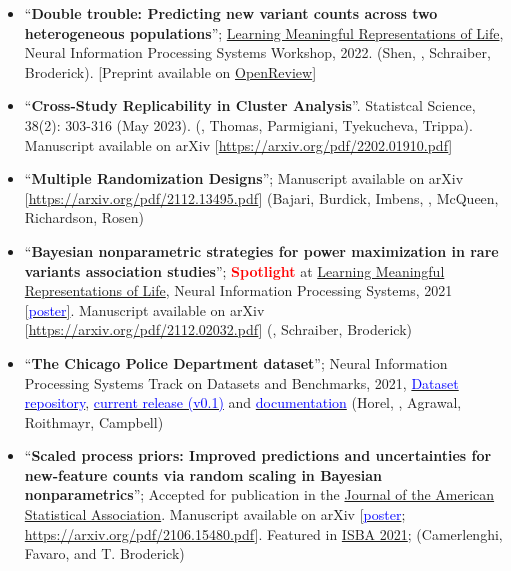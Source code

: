 \documentclass[10pt, a4paper]{article}
\begin{document}
\begin{itemize}
	\item ``\textbf{Double trouble: Predicting new variant counts across two heterogeneous populations}''; \href{https://www.lmrl.org/}{Learning Meaningful Representations of Life},  Neural Information Processing Systems Workshop, 2022. (Shen, \mm, Schraiber, Broderick). [Preprint available on \href{https://openreview.net/pdf?id=euBgC9yLeyl}{OpenReview}]
	\item``\textbf{Cross-Study Replicability in Cluster Analysis}''. Statistcal Science, 38(2): 303-316 (May 2023).  (\mm, Thomas, Parmigiani, Tyekucheva, Trippa). Manuscript available on arXiv [\url{https://arxiv.org/pdf/2202.01910.pdf}] 
	\item ``\textbf{Multiple Randomization Designs}''; Manuscript available on arXiv [\url{https://arxiv.org/pdf/2112.13495.pdf}] (Bajari, Burdick, Imbens, \mm, McQueen, Richardson, Rosen)
	\item ``\textbf{Bayesian nonparametric strategies for power maximization in rare variants association studies}''; \textcolor{red}{\textbf{Spotlight}} at \href{https://www.lmrl.org/}{Learning Meaningful Representations of Life},  Neural Information Processing Systems, 2021 [\href{https://lorenzomasoero.com/files/LRML_21_poster.pdf}{\textcolor{blue}{poster}]}. Manuscript available on arXiv [\url{https://arxiv.org/pdf/2112.02032.pdf}] (\mm, Schraiber, Broderick)
	\item ``\textbf{The Chicago Police Department dataset}''; Neural Information Processing Systems Track on Datasets and Benchmarks, 2021, \href{https://github.com/chicago-police-violence/data}{\textcolor{blue}{Dataset repository}}, \href{https://github.com/chicago-police-violence/data/releases/tag/v0.1}{\textcolor{blue}{current release (v0.1)}} and \href{https://github.com/chicago-police-violence/data/releases/download/v0.1/documentation.pdf}{\textcolor{blue}{documentation}} (Horel, \mm, Agrawal, Roithmayr, Campbell)
	\item ``\textbf{Scaled process priors: Improved predictions and uncertainties for new-feature counts via random scaling in Bayesian nonparametrics}''; Accepted for publication in the \href{https://www.tandfonline.com/doi/full/10.1080/01621459.2022.2115918}{Journal of the American Statistical Association}. Manuscript available on arXiv [\href{https://lorenzomasoero.com/files/spp_poster.pdf}{\textcolor{blue}{poster}}; \url{https://arxiv.org/pdf/2106.15480.pdf}]. Featured in \href{https://whova.com/portal/webapp/isbaw_202106/}{ISBA 2021}; (Camerlenghi, Favaro, \mm and T. Broderick)

\end{itemize}
\end{document}
